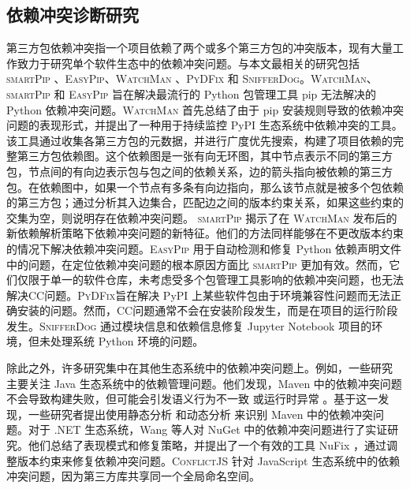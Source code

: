 \subsection{依赖冲突诊断研究}
第三方包依赖冲突指一个项目依赖了两个或多个第三方包的冲突版本，现有大量工作致力于研究单个软件生态中的依赖冲突问题。与本文最相关的研究包括 \textsc{smartPip} 、\textsc{EasyPip}、\textsc{WatchMan} 、\textsc{PyDFix} 和 \textsc{SnifferDog}。\textsc{WatchMan}、\textsc{smartPip} 和 \textsc{EasyPip} 旨在解决最流行的 Python 包管理工具 pip 无法解决的 Python 依赖冲突问题。\textsc{WatchMan} 首先总结了由于 pip 安装规则导致的依赖冲突问题的表现形式，并提出了一种用于持续监控 PyPI 生态系统中依赖冲突的工具。该工具通过收集各第三方包的元数据，并进行广度优先搜索，构建了项目依赖的完整第三方包依赖图。这个依赖图是一张有向无环图，其中节点表示不同的第三方包，节点间的有向边表示包与包之间的依赖关系，边的箭头指向被依赖的第三方包。在依赖图中，如果一个节点有多条有向边指向，那么该节点就是被多个包依赖的第三方包；通过分析其入边集合，匹配边之间的版本约束关系，如果这些约束的交集为空，则说明存在依赖冲突问题。
\textsc{smartPip} 揭示了在 \textsc{WatchMan} 发布后的新依赖解析策略下依赖冲突问题的新特征。他们的方法同样能够在不更改版本约束的情况下解决依赖冲突问题。\textsc{EasyPip} 用于自动检测和修复 Python 依赖声明文件中的问题，在定位依赖冲突问题的根本原因方面比 \textsc{smartPip} 更加有效。然而，它们仅限于单一的软件仓库，未考虑受多个包管理工具影响的依赖冲突问题，也无法解决CC问题。\textsc{PyDFix}旨在解决 PyPI 上某些软件包由于环境兼容性问题而无法正确安装的问题。然而，CC问题通常不会在安装阶段发生，而是在项目的运行阶段发生。\textsc{SnifferDog} 通过模块信息和依赖信息修复 Jupyter Notebook 项目的环境，但未处理系统 Python 环境的问题。

除此之外，许多研究集中在其他生态系统中的依赖冲突问题上。例如，一些研究  主要关注 Java 生态系统中的依赖管理问题。他们发现，Maven 中的依赖冲突问题不会导致构建失败，但可能会引发语义行为不一致  或运行时异常 。基于这一发现，一些研究者提出使用静态分析 和动态分析  来识别 Maven 中的依赖冲突问题。对于 .NET 生态系统，Wang 等人对 NuGet 中的依赖冲突问题进行了实证研究。他们总结了表现模式和修复策略，并提出了一个有效的工具 NuFix ，通过调整版本约束来修复依赖冲突问题。\textsc{ConflictJS} 针对 JavaScript 生态系统中的依赖冲突问题，因为第三方库共享同一个全局命名空间。

